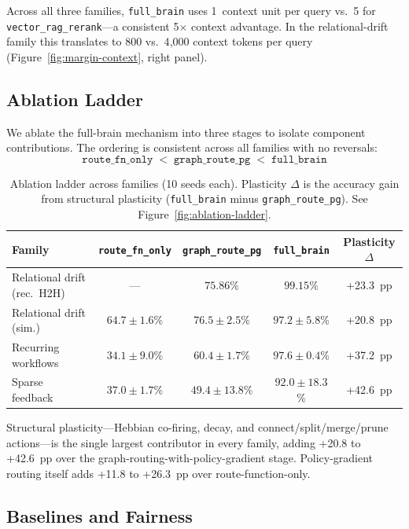 \documentclass[11pt]{article}
\begin{document}
Across all three families, \texttt{full\_brain} uses 1~context unit per query
vs.\ 5 for \texttt{vector\_rag\_rerank}---a consistent 5$\times$ context
advantage. In the relational-drift family this translates to 800 vs.\
4{,}000 context tokens per query (Figure~\ref{fig:margin-context}, right panel).

\subsection{Ablation Ladder}
\label{sec:ablation}

We ablate the full-brain mechanism into three stages to isolate component
contributions. The ordering is consistent across all families with no reversals:
\[
\texttt{route\_fn\_only} \;<\; \texttt{graph\_route\_pg} \;<\;
\texttt{full\_brain}
\]

\begin{table}[h]
\centering
\small
\begin{tabular}{lcccc}
\toprule
Family & \texttt{route\_fn\_only} & \texttt{graph\_route\_pg} & \texttt{full\_brain} & Plasticity $\Delta$ \\
\midrule
Relational drift (rec.\ H2H) & --- & $75.86$\% & $99.15$\% & +23.3~pp \\
Relational drift (sim.) & $64.7 \pm 1.6$\% & $76.5 \pm 2.5$\% & $97.2 \pm 5.8$\% & +20.8~pp \\
Recurring workflows & $34.1 \pm 9.0$\% & $60.4 \pm 1.7$\% & $97.6 \pm 0.4$\% & +37.2~pp \\
Sparse feedback & $37.0 \pm 1.7$\% & $49.4 \pm 13.8$\% & $92.0 \pm 18.3$\% & +42.6~pp \\
\bottomrule
\end{tabular}
\caption{Ablation ladder across families (10 seeds each). Plasticity $\Delta$ is
the accuracy gain from structural plasticity (\texttt{full\_brain} minus
\texttt{graph\_route\_pg}). See Figure~\ref{fig:ablation-ladder}.}
\label{tab:ablation}
\end{table}

Structural plasticity---Hebbian co-firing, decay, and connect/split/merge/prune
actions---is the single largest contributor in every family, adding +20.8 to
+42.6~pp over the graph-routing-with-policy-gradient stage. Policy-gradient
routing itself adds +11.8 to +26.3~pp over route-function-only.

\subsection{Baselines and Fairness}
\label{sec:baselines}
\end{document}
